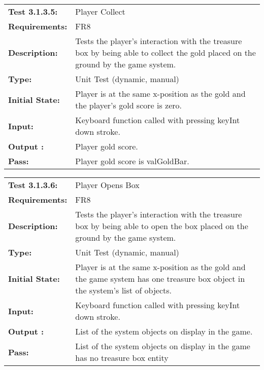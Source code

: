 \documentclass[12pt, titlepage]{article}
\begin{document}
\begin{tabular}{|l|p{10cm}|}
    \hline
    \bf{Test} 3.1.3.5: & Player Collect\\
    \bf{Requirements}: & FR8\\
    \bf{Description}: & Tests the player's interaction with the treasure box by being able to collect the gold placed on the ground by the game system.\\
    \bf{Type}: & Unit Test (dynamic, manual) \\
    \bf{Initial State}: & Player is at the same x-position as the gold  and the player's gold score is zero. \\
    \bf{Input}: & Keyboard function called with pressing keyInt down stroke.\\
    \bf{Output} : & Player gold score.\\
    \bf{Pass}: & Player gold score is valGoldBar.\\
    \hline
\end{tabular}

\begin{tabular}{|l|p{10cm}|}
    \hline
    \bf{Test} 3.1.3.6: & Player Opens Box\\
    \bf{Requirements}: & FR8\\
    \bf{Description}: & Tests the player's interaction with the treasure box by being able to open the box placed on the ground by the game system.\\
    \bf{Type}: & Unit Test (dynamic, manual) \\
    \bf{Initial State}: & Player is at the same x-position as the gold  and the game system has one treasure box object in the system's list of objects. \\
    \bf{Input}: & Keyboard function called with pressing keyInt down stroke.\\
    \bf{Output} : & List of the system objects on display in the game.\\
    \bf{Pass}: & List of the system objects on display in the game has no treasure box entity\\
    \hline
\end{tabular}
\end{document}
